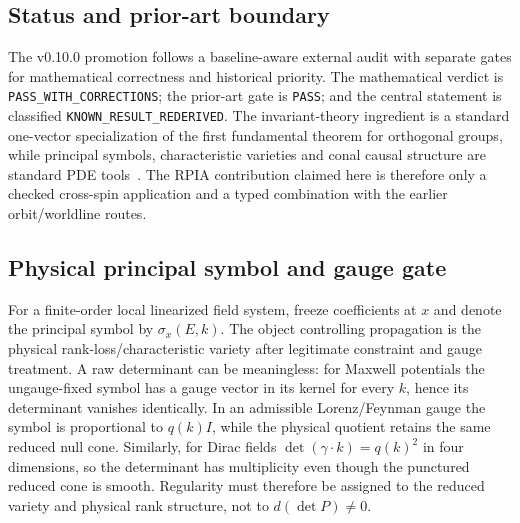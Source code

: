 \documentclass[11pt,a4paper]{article}
\begin{document}
\subsection{Status and prior-art boundary}
The v0.10.0 promotion follows a baseline-aware external audit with separate gates for mathematical correctness and historical priority. The mathematical verdict is \texttt{PASS\_WITH\_CORRECTIONS}; the prior-art gate is \texttt{PASS}; and the central statement is classified \texttt{KNOWN\_RESULT\_REDERIVED}. The invariant-theory ingredient is a standard one-vector specialization of the first fundamental theorem for orthogonal groups, while principal symbols, characteristic varieties and conal causal structure are standard PDE tools~\cite{weyl1939,hormander1963,geroch1996,khavkine2012,dull2016}. The RPIA contribution claimed here is therefore only a checked cross-spin application and a typed combination with the earlier orbit/worldline routes.

\subsection{Physical principal symbol and gauge gate}
For a finite-order local linearized field system, freeze coefficients at $x$ and denote the principal symbol by $\sigma_x(E,k)$. The object controlling propagation is the physical rank-loss/characteristic variety after legitimate constraint and gauge treatment. A raw determinant can be meaningless: for Maxwell potentials the ungauge-fixed symbol has a gauge vector in its kernel for every $k$, hence its determinant vanishes identically. In an admissible Lorenz/Feynman gauge the symbol is proportional to $q(k)I$, while the physical quotient retains the same reduced null cone. Similarly, for Dirac fields $\det(\gamma\cdot k)=q(k)^2$ in four dimensions, so the determinant has multiplicity even though the punctured reduced cone is smooth. Regularity must therefore be assigned to the reduced variety and physical rank structure, not to $d(\det P)\neq0$.
\end{document}
